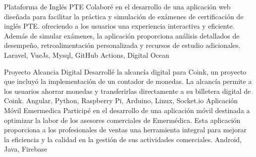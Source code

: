 %
%
%


\begin{projects}
	\project
	{Plataforma de Inglés PTE}{}
	{Colaboré en el desarrollo de una aplicación web diseñada para facilitar la práctica y simulación de exámenes de certificación de inglés PTE. ofreciendo a los usuarios una experiencia interactiva y eficiente. Además de simular exámenes, la aplicación proporciona análisis detallados de desempeño, retroalimentación personalizada y recursos de estudio adicionales.} 
	{Laravel, VueJs, Mysql, GitHub Actions, Digital Ocean}
				
	\project
	{Proyecto Alcancia Digital}{}
	{Desarrollé la alcancía digital para Coink, un proyecto que incluyó la implementación de un contador de monedas. La alcancía permite a los usuarios ahorrar monedas y transferirlas directamente a su billetera digital de Coink.}
	{	Angular, Python, Raspberry Pi, Arduino, Linux, Socket.io }
	\project
	{Aplicación Móvil Emermedica }{}
	{Participé en el desarrollo de una aplicación móvil destinada a optimizar la labor de los asesores comerciales de Emermédica. Esta aplicación proporciona a los profesionales de ventas una herramienta integral para mejorar la eficiencia y la calidad en la gestión de sus actividades comerciales.}
	{ Android, Java, Firebase }

\end{projects}